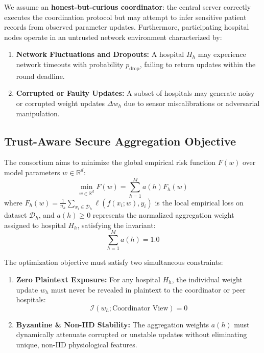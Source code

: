 \documentclass[conference]{IEEEtran}
\begin{document}
We assume an \textbf{honest-but-curious coordinator}: the central server correctly executes the coordination protocol but may attempt to infer sensitive patient records from observed parameter updates. Furthermore, participating hospital nodes operate in an untrusted network environment characterized by:
\begin{enumerate}
    \item \textbf{Network Fluctuations and Dropouts:} A hospital $H_h$ may experience network timeouts with probability $p_{\text{drop}}$, failing to return updates within the round deadline.
    \item \textbf{Corrupted or Faulty Updates:} A subset of hospitals may generate noisy or corrupted weight updates $\Delta w_h$ due to sensor miscalibrations or adversarial manipulation.
\end{enumerate}

\subsection{Trust-Aware Secure Aggregation Objective}
The consortium aims to minimize the global empirical risk function $F(w)$ over model parameters $w \in \mathbb{R}^d$:
\begin{equation}
\min_{w \in \mathbb{R}^d} F(w) = \sum_{h=1}^M a(h) F_h(w)
\end{equation}
where $F_h(w) = \frac{1}{n_h} \sum_{x_i \in \mathcal{D}_h} \ell(f(x_i; w), y_i)$ is the local empirical loss on dataset $\mathcal{D}_h$, and $a(h) \ge 0$ represents the normalized aggregation weight assigned to hospital $H_h$, satisfying the invariant:
\begin{equation}
\sum_{h=1}^M a(h) = 1.0
\end{equation}

The optimization objective must satisfy two simultaneous constraints:
\begin{enumerate}
    \item \textbf{Zero Plaintext Exposure:} For any hospital $H_h$, the individual weight update $w_h$ must never be revealed in plaintext to the coordinator or peer hospitals:
    \begin{equation}
    \mathcal{I}(w_h; \text{Coordinator View}) = 0
    \end{equation}
    \item \textbf{Byzantine \& Non-IID Stability:} The aggregation weights $a(h)$ must dynamically attenuate corrupted or unstable updates without eliminating unique, non-IID physiological features.
\end{enumerate}
\end{document}
